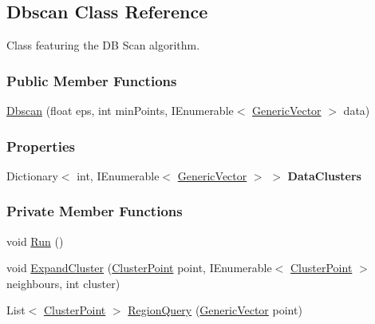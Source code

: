 \hypertarget{classDataTools_1_1clustering_1_1Dbscan}{}\subsection{Dbscan Class Reference}
\label{classDataTools_1_1clustering_1_1Dbscan}


Class featuring the DB Scan algorithm.  


\subsubsection*{Public Member Functions}
\begin{DoxyCompactItemize}
\item 
\hyperlink{classDataTools_1_1clustering_1_1Dbscan_ac54fa4e699ed60d33e90b0deab9f4006_ac54fa4e699ed60d33e90b0deab9f4006}{Dbscan} (float eps, int min\+Points, I\+Enumerable$<$ \hyperlink{classDataTools_1_1GenericVector}{Generic\+Vector} $>$ data)
\end{DoxyCompactItemize}
\subsubsection*{Properties}
\begin{DoxyCompactItemize}
\item 
\mbox{\label{classDataTools_1_1clustering_1_1Dbscan_a06317119faad60c7efd9feabeb13c795}} 
Dictionary$<$ int, I\+Enumerable$<$ \hyperlink{classDataTools_1_1GenericVector}{Generic\+Vector} $>$ $>$ {\bfseries Data\+Clusters}
\end{DoxyCompactItemize}
\subsubsection*{Private Member Functions}
\begin{DoxyCompactItemize}
\item 
void \hyperlink{classDataTools_1_1clustering_1_1Dbscan_aa3eca255b6be227d7d901cc2a72017a5_aa3eca255b6be227d7d901cc2a72017a5}{Run} ()
\item 
void \hyperlink{classDataTools_1_1clustering_1_1Dbscan_ab6e01c3398f0428cefb36534632be549_ab6e01c3398f0428cefb36534632be549}{Expand\+Cluster} (\hyperlink{classDataTools_1_1clustering_1_1ClusterPoint}{Cluster\+Point} point, I\+Enumerable$<$ \hyperlink{classDataTools_1_1clustering_1_1ClusterPoint}{Cluster\+Point} $>$ neighbours, int cluster)
\item 
List$<$ \hyperlink{classDataTools_1_1clustering_1_1ClusterPoint}{Cluster\+Point} $>$ \hyperlink{classDataTools_1_1clustering_1_1Dbscan_a617035ae624d3cb57cc198897e727da4_a617035ae624d3cb57cc198897e727da4}{Region\+Query} (\hyperlink{classDataTools_1_1GenericVector}{Generic\+Vector} point)
\end{DoxyCompactItemize}

